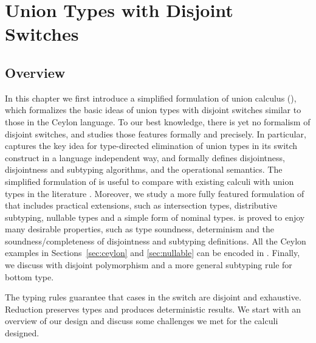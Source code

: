 
\chapter{Union Types with Disjoint Switches}
\label{chap:switch}






\section{Overview}\label{subsec:key}

In this chapter we first introduce a simplified formulation of union calculus (\name), which
formalizes the basic ideas of union types with disjoint switches similar
to those in the Ceylon language.  To our best knowledge, there is yet
no formalism of disjoint switches, and \name studies those features
formally and precisely. In particular, \name captures the key idea
for type-directed elimination of union types in its switch construct
in a language independent way, and formally defines disjointness,
disjointness and subtyping algorithms, and the operational semantics.
The simplified formulation of \name is useful to compare with
existing calculi with union types in the literature
\citep{macqueen1984ideal,barbanera1995intersection,dunfield2003type,dunfield2014elaborating,pierce1991programming,castagna2005gentle}.
Moreover,
we study a more fully featured formulation of \name that includes practical
extensions, such as intersection types, distributive subtyping, nullable types and a simple
form of nominal types. \name is proved to enjoy many desirable properties, such as type
soundness, determinism and the soundness/completeness of disjointness and subtyping
definitions.  All the Ceylon examples in Sections~\ref{sec:ceylon} and
\ref{sec:nullable} can be encoded in \name. Finally, we discuss \name with
disjoint polymorphism and a more general subtyping rule for bottom type.

The typing rules guarantee that cases in the switch are disjoint and exhaustive.
Reduction preserves types and produces deterministic results.
We start with an overview of our design and discuss some challenges
we met for the calculi designed.

